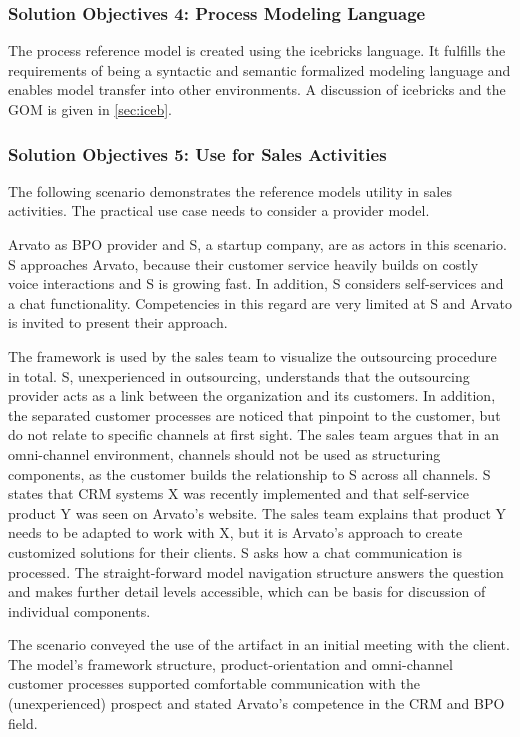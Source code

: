 \subsubsection{Solution Objectives 4: Process Modeling Language }
The process reference model is created using the icebricks language. It fulfills the requirements of being a syntactic and semantic formalized modeling language and enables model transfer into other environments. A discussion of icebricks and the \acrshort{GOM} is given in \ref{sec:iceb}. 

\subsubsection{Solution Objectives 5: Use for Sales Activities}

The following scenario demonstrates the reference models utility in sales activities. The practical use case needs to consider a provider model.  

Arvato as BPO provider and S, a startup company, are as actors in this scenario. S approaches Arvato, because their customer service heavily builds on costly voice interactions and S is growing fast. In addition, S considers self-services and a chat functionality. Competencies in this regard are very limited at S and Arvato is invited to present their approach. 

The framework is used by the sales team to visualize the outsourcing procedure in total. S, unexperienced in outsourcing, understands that the outsourcing provider acts as a link between the organization and its customers. In addition, the separated customer processes are noticed that pinpoint to the customer, but do not relate to specific channels at first sight. The sales team argues that in an omni-channel environment, channels should not be used as structuring components, as the customer builds the relationship to S across all channels. S states that CRM systems X was recently implemented and that self-service product Y was seen on Arvato's website. The sales team explains that product Y needs to be adapted to work with X, but it is Arvato's approach to create customized solutions for their clients. S asks how a chat communication is processed. The straight-forward model navigation structure answers the question and makes further detail levels accessible, which can be basis for discussion of individual components. 

The scenario conveyed the use of the artifact in an initial meeting with the client. The model's framework structure, product-orientation and omni-channel customer processes supported comfortable communication with the (unexperienced) prospect and stated Arvato's competence in the CRM and BPO field.

